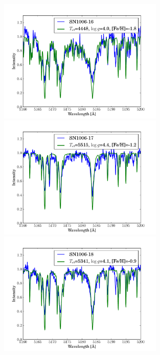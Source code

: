 \begin{figure}[htbp]
   \label{fig:sn1006_candfit}
\end{figure}\begin{figure}[htbp] %
   \centering
\includegraphics[width=0.7\textwidth, trim=0 0mm 0 10mm, clip]{chapter_sn1006/plots/gold_spectra/sn1006_16.pdf}
\includegraphics[width=0.7\textwidth, trim=0 0mm 0 10mm, clip]{chapter_sn1006/plots/gold_spectra/sn1006_17.pdf}
\includegraphics[width=0.7\textwidth, trim=0 0mm 0 10mm, clip]{chapter_sn1006/plots/gold_spectra/sn1006_18.pdf}


\end{figure}
